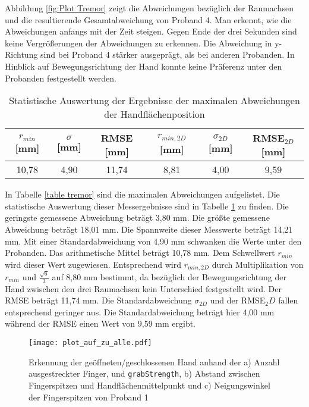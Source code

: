 Abbildung \ref{fig:Plot Tremor} zeigt die Abweichungen bezüglich der Raumachsen und die resultierende Gesamtabweichung von Proband 4. Man erkennt, wie die Abweichungen anfangs mit der Zeit steigen. Gegen Ende der drei Sekunden sind keine Vergrößerungen der Abweichungen zu erkennen. Die Abweichung in y-Richtung sind bei Proband 4 stärker ausgeprägt, als bei anderen Probanden. In Hinblick auf Bewegungsrichtung der Hand konnte keine Präferenz unter den Probanden festgestellt werden.



\begin{table}[htb]
	\caption{Statistische Auswertung der Ergebnisse der maximalen Abweichungen der Handflächenposition}
	\label{table tremor2}
	\begin{center}
		\begin{tabular}{|c|c|c|c|c|c|}
			\hline 
			$r_{min}$ [mm] & $\sigma$ [mm] & RMSE [mm] & $r_{min,2D}$ [mm] & $\sigma_{2D}$ [mm] & RMSE$_{2D}$ [mm] \\
			\hline 
			10,78 & 4,90 & 11,74 & 8,81 & 4,00 & 9,59 \\ 
			\hline 
		\end{tabular} 
	\end{center}
\end{table}

In Tabelle \ref{table tremor} sind die maximalen Abweichungen aufgelistet. Die statistische Auswertung dieser Messergebnisse sind in Tabelle \ref{table tremor2} zu finden. Die geringste gemessene Abweichung beträgt 3,80 mm. Die größte gemessene Abweichung beträgt 18,01 mm. Die Spannweite dieser Messwerte beträgt 14,21 mm. Mit einer Standardabweichung von 4,90 mm schwanken die Werte unter den Probanden. Das arithmetische Mittel beträgt 10,78 mm. Dem Schwellwert $r_{min}$ wird dieser Wert zugewiesen. Entsprechend wird $r_{min,2D}$ durch Multiplikation von $r_{min}$ und $\frac{\sqrt{6}}{3}$ auf 8,80 mm bestimmt, da bezüglich der Bewegungsrichtung der Hand zwischen den drei Raumachsen kein Unterschied festgestellt wird. Der RMSE beträgt 11,74 mm. Die Standardabweichung $\sigma_{2D}$ und der RMSE$_2D$ fallen entsprechend geringer aus. Die Standardabweichung beträgt hier 4,00 mm während der RMSE einen Wert von 9,59 mm ergibt.

\begin{figure}[H]
	\centering
	\texttt{[image: plot\_auf\_zu\_alle.pdf]}
	\caption[Erkennung der geöffneten/geschlossenen Hand]{Erkennung der geöffneten/geschlossenen Hand anhand der a) Anzahl ausgestreckter Finger, und \texttt{grabStrength}, b) Abstand zwischen Fingerspitzen und Handflächenmittelpunkt und c) Neigungswinkel der Fingerspitzen von Proband 1}
	\label{fig:plot_auf_zu_alle}
\end{figure}
